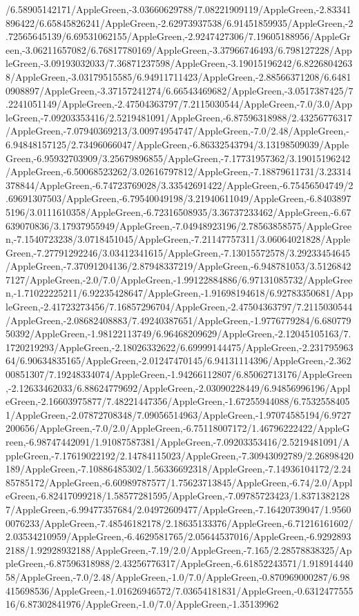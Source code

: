 {\begin{tikzternal}
/6.58905142171/AppleGreen,-3.03660629788/7.08221909119/AppleGreen,-2.83341896422/6.65845826241/AppleGreen,-2.62973937538/6.91451859935/AppleGreen,-2.72565645139/6.69531062155/AppleGreen,-2.9247427306/7.19605188956/AppleGreen,-3.06211657082/6.76817780169/AppleGreen,-3.37966746493/6.798127228/AppleGreen,-3.09193032033/7.36871237598/AppleGreen,-3.19015196242/6.82268042638/AppleGreen,-3.03179515585/6.94911711423/AppleGreen,-2.88566371208/6.64810908897/AppleGreen,-3.37157241274/6.66543469682/AppleGreen,-3.0517387425/7.2241051149/AppleGreen,-2.47504363797/7.2115030544/AppleGreen,-7.0/3.0/AppleGreen,-7.09203353416/2.5219481091/AppleGreen,-6.87596318988/2.43256776317/AppleGreen,-7.07940369213/3.00974954747/AppleGreen,-7.0/2.48/AppleGreen,-6.94848157125/2.73496066047/AppleGreen,-6.86332543794/3.13198509039/AppleGreen,-6.95932703909/3.25679896855/AppleGreen,-7.17731957362/3.19015196242/AppleGreen,-6.50068523262/3.02616797812/AppleGreen,-7.18879611731/3.23314378844/AppleGreen,-6.74723769028/3.33542691422/AppleGreen,-6.75456504749/2.69691307503/AppleGreen,-6.79540049198/3.21940611049/AppleGreen,-6.84038975196/3.0111610358/AppleGreen,-6.72316508935/3.36737233462/AppleGreen,-6.67639070836/3.17937955949/AppleGreen,-7.04948923196/2.78563858575/AppleGreen,-7.1540723238/3.0718451045/AppleGreen,-7.21147757311/3.06064021828/AppleGreen,-7.27791292246/3.03412341615/AppleGreen,-7.13015572578/3.29233454645/AppleGreen,-7.37091204136/2.87948337219/AppleGreen,-6.948781053/3.51268427127/AppleGreen,-2.0/7.0/AppleGreen,-1.99122884886/6.97131085732/AppleGreen,-1.71022225211/6.92235428647/AppleGreen,-1.91698194618/6.92783350681/AppleGreen,-2.41723273456/7.16857296704/AppleGreen,-2.47504363797/7.2115030544/AppleGreen,-2.08682408883/7.49240387651/AppleGreen,-1.9776779284/6.68077950392/AppleGreen,-1.98122113749/6.96468209629/AppleGreen,-2.12045105163/7.1720219293/AppleGreen,-2.18026332622/6.69999144475/AppleGreen,-2.23179596364/6.90634835165/AppleGreen,-2.01247470145/6.94131114396/AppleGreen,-2.36200851307/7.19248334074/AppleGreen,-1.94266112807/6.85062713176/AppleGreen,-2.12633462033/6.88624779692/AppleGreen,-2.03090228449/6.94856996196/AppleGreen,-2.16603975877/7.48221447356/AppleGreen,-1.67255944088/6.75325584051/AppleGreen,-2.07872708348/7.09056514963/AppleGreen,-1.97074585194/6.9727200656/AppleGreen,-7.0/2.0/AppleGreen,-6.75118007172/1.46796222422/AppleGreen,-6.98747442091/1.91087587381/AppleGreen,-7.09203353416/2.5219481091/AppleGreen,-7.17619022192/2.14784115023/AppleGreen,-7.30943092789/2.26898420189/AppleGreen,-7.10886485302/1.56336692318/AppleGreen,-7.14936104172/2.2485785172/AppleGreen,-6.60989787577/1.75623713845/AppleGreen,-6.74/2.0/AppleGreen,-6.82417099218/1.58577281595/AppleGreen,-7.09785723423/1.83713821287/AppleGreen,-6.99477357684/2.04972609477/AppleGreen,-7.16420739047/1.95600076233/AppleGreen,-7.48546182178/2.18635133376/AppleGreen,-6.71216161602/2.03534210959/AppleGreen,-6.4629581765/2.05644537016/AppleGreen,-6.92928932188/1.92928932188/AppleGreen,-7.19/2.0/AppleGreen,-7.165/2.28578838325/AppleGreen,-6.87596318988/2.43256776317/AppleGreen,-6.61852243571/1.91891444058/AppleGreen,-7.0/2.48/AppleGreen,-1.0/7.0/AppleGreen,-0.870969000287/6.98415698536/AppleGreen,-1.01626946572/7.03654181831/AppleGreen,-0.631247755516/6.87302841976/AppleGreen,-1.0/7.0/AppleGreen,-1.35139962
\end{tikzternal}}
